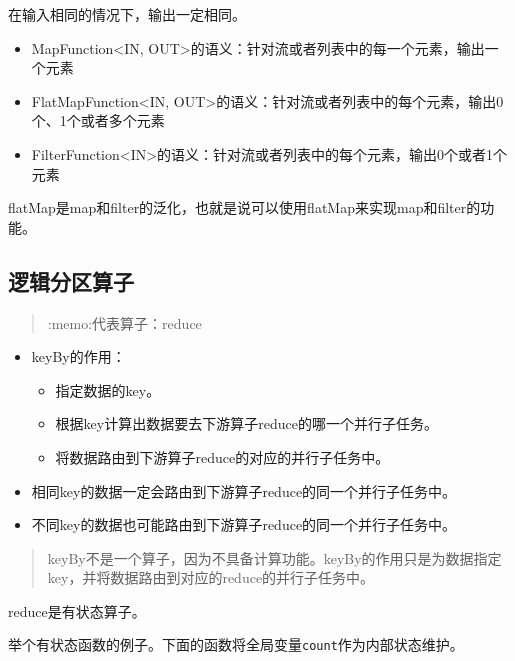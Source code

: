 在输入相同的情况下，输出一定相同。

\begin{itemize}
\tightlist
\item
  MapFunction\textless IN,
  OUT\textgreater 的语义：针对流或者列表中的每一个元素，输出一个元素
\item
  FlatMapFunction\textless IN,
  OUT\textgreater 的语义：针对流或者列表中的每个元素，输出0个、1个或者多个元素
\item
  FilterFunction\textless IN\textgreater 的语义：针对流或者列表中的每个元素，输出0个或者1个元素
\end{itemize}

flatMap是map和filter的泛化，也就是说可以使用flatMap来实现map和filter的功能。

\hypertarget{ux903bux8f91ux5206ux533aux7b97ux5b50}{%
\subsection{逻辑分区算子}\label{ux903bux8f91ux5206ux533aux7b97ux5b50}}

\begin{quote}
:memo:代表算子：reduce
\end{quote}

\begin{itemize}
\tightlist
\item
  keyBy的作用：

  \begin{itemize}
  \tightlist
  \item
    指定数据的key。
  \item
    根据key计算出数据要去下游算子reduce的哪一个并行子任务。
  \item
    将数据路由到下游算子reduce的对应的并行子任务中。
  \end{itemize}
\item
  相同key的数据一定会路由到下游算子reduce的同一个并行子任务中。
\item
  不同key的数据也可能路由到下游算子reduce的同一个并行子任务中。
\end{itemize}

\begin{quote}
keyBy不是一个算子，因为不具备计算功能。keyBy的作用只是为数据指定key，并将数据路由到对应的reduce的并行子任务中。
\end{quote}

reduce是{有状态算子}。

举个有状态函数的例子。下面的函数将全局变量\texttt{count}作为内部状态维护。

